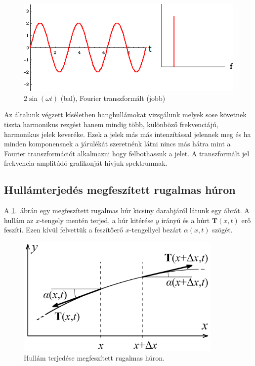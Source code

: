 \documentclass[a4paper,12pt]{article}
\newcommand{\V}[1]{\mathbf{#1}}
\begin{document}
\begin{figure}[!h]
\centering
\includegraphics[scale=1]{PowerSpectrum1.png}
\caption{$2 \sin(\omega t)$ (bal), Fourier transzformált (jobb)}
\end{figure} 
Az általunk végzett kíséletben hanghullámokat vizsgálunk melyek sose követnek tiszta harmonikus rezgést hanem mindig több, különböző frekvenciájú, harmonikus jelek keveréke. Ezek a jelek más más intenzítással jelennek meg és ha minden komponensnek a járulékát szeretnénk látni nincs más hátra mint a Fourier transzformációt alkalmazni hogy felbothassuk a jelet. A transzformált jel frekvencia-amplitúdó grafikonját hívjuk spektrumnak.

\subsection{Hullámterjedés megfeszített rugalmas húron}

A \ref{hur_hullam}.\ ábrán egy megfeszített rugalmas húr kicsiny darabjáról látunk egy ábrát. A hullám az $x$-tengely mentén terjed, a húr kitérése $y$ irányú és a húrt $\V{T}(x, t)$ erő feszíti. Ezen kívül felvettük a feszítőerő $x$-tengellyel bezárt $\alpha(x, t)$ szögét.

\begin{figure}[!h]
\centering
\includegraphics[width = 10cm]{hur_hullam.png}
\caption{Hullám terjedése megfeszített rugalmas húron. \cite{kisfiz1}}
\label{hur_hullam}
\end{figure}
\end{document}
